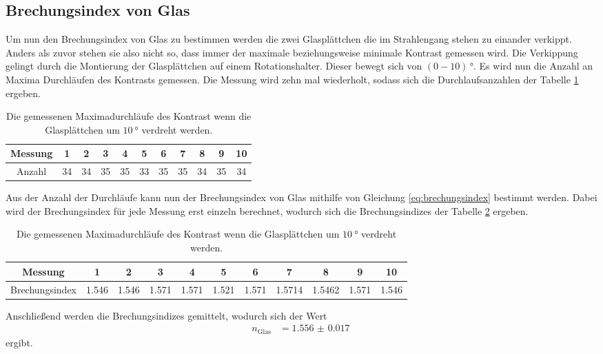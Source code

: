 \subsection{Brechungsindex von Glas}
Um nun den Brechungsindex von Glas zu bestimmen werden die zwei Glasplättchen die im Strahlengang stehen zu einander verkippt.
Anders als zuvor stehen sie also nicht so, dass immer der maximale beziehungsweise minimale Kontrast gemessen wird.
Die Verkippung gelingt durch die Montierung der Glasplättchen auf einem Rotationshalter.
Dieser bewegt sich von $(0-10)\,\si{\degree}$.
Es wird nun die Anzahl an Maxima Durchläufen des Kontrasts gemessen.
Die Messung wird zehn mal wiederholt, sodass sich die Durchlaufsanzahlen der Tabelle \ref{tab:counts_glas} ergeben.
\begin{table}
    \centering
    \begin{tabular}{ccccccccccc}
        \toprule 
        Messung & 1&2&3&4&5&6&7&8&9&10\\
        \midrule
        Anzahl &34 & 34& 35& 35& 33& 35& 35& 34& 35& 34\\
        \bottomrule
    \end{tabular}
    \caption{Die gemessenen Maximadurchläufe des Kontrast wenn die Glasplättchen um $\SI{10}{\degree}$ verdreht werden.}
    \label{tab:counts_glas}
\end{table}
Aus der Anzahl der Durchläufe kann nun der Brechungsindex von Glas mithilfe von Gleichung \eqref{eq:brechungsindex} bestimmt werden.
Dabei wird der Brechungsindex für jede Messung erst einzeln berechnet, wodurch sich die Brechungsindizes der Tabelle \ref{tab:n_glas} ergeben.
\begin{table}
    \hspace*{-1cm}
    \begin{tabular}{ccccccccccc}
        \toprule 
        Messung & 1&2&3&4&5&6&7&8&9&10\\
        \midrule
        Brechungsindex &1.546&1.546&1.571&1.571&1.521&1.571& 1.5714&1.5462&1.571& 1.546\\
        \bottomrule
    \end{tabular}
    \caption{Die gemessenen Maximadurchläufe des Kontrast wenn die Glasplättchen um $\SI{10}{\degree}$ verdreht werden.}
    \label{tab:n_glas}
\end{table}
\FloatBarrier\noindent
Anschließend werden die Brechungsindizes gemittelt, wodurch sich der Wert 
\begin{align*}
    n_\text{Glas} &= \SI{1.556(17)}{}
\end{align*}
ergibt.

